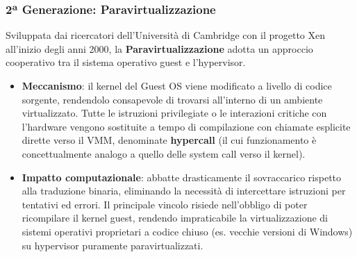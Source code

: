 \documentclass[11pt, a4paper]{article}
\begin{document}
\subsubsection{2ª Generazione: Paravirtualizzazione}
Sviluppata dai ricercatori dell'Università di Cambridge con il progetto Xen all'inizio degli anni 2000, la \textbf{Paravirtualizzazione} adotta un approccio cooperativo tra il sistema operativo guest e l'hypervisor.
\begin{itemize}
    \item \textbf{Meccanismo}: il kernel del Guest OS viene modificato a livello di codice sorgente, rendendolo consapevole di trovarsi all'interno di un ambiente virtualizzato. Tutte le istruzioni privilegiate o le interazioni critiche con l'hardware vengono sostituite a tempo di compilazione con chiamate esplicite dirette verso il VMM, denominate \textbf{hypercall} (il cui funzionamento è concettualmente analogo a quello delle system call verso il kernel).
    \item \textbf{Impatto computazionale}: abbatte drasticamente il sovraccarico rispetto alla traduzione binaria, eliminando la necessità di intercettare istruzioni per tentativi ed errori. Il principale vincolo risiede nell'obbligo di poter ricompilare il kernel guest, rendendo impraticabile la virtualizzazione di sistemi operativi proprietari a codice chiuso (es. vecchie versioni di Windows) su hypervisor puramente paravirtualizzati.
\end{itemize}
\end{document}
